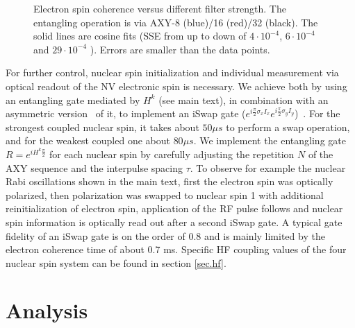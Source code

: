 \documentclass[aps,floatfix,footinbib,superscriptaddress]{revtex4-1}
\begin{document}
\begin{figure}[H]
\centerline{}
\caption{Electron spin coherence versus different filter strength. The entangling operation is via AXY-8 (blue)/16 (red)/32 (black). The solid lines are cosine fits (SSE from up to down of $4\cdot10^{-4}$, $6\cdot10^{-4}$ and $29\cdot10^{-4}$ ). Errors are smaller than the data points.}
\label{fig:S2}
\end{figure}

For further control, nuclear spin initialization and individual measurement via optical readout of the NV electronic spin is necessary. We achieve both by using an entangling gate mediated by $H^k$ (see main text), in combination with an asymmetric version~\cite{Souza4748} of it, to implement an iSwap gate ($e^{i\frac{\pi}{2}\sigma_xI_x}e^{i\frac{\pi}{2}\sigma_yI_y}$)~\cite{Cas17}. For the strongest coupled nuclear spin, it takes about $50\mu s$ to perform a swap operation, and for the weakest coupled one about $80\mu s$. We implement the entangling gate $R=e^{iH^k\frac{\pi}{2}}$ for each nuclear spin by carefully adjusting the repetition $N$ of the AXY sequence and the interpulse spacing $\tau$. To observe for example the nuclear Rabi oscillations shown in the main text, first the electron spin was optically polarized, then polarization was swapped to nuclear spin 1 with additional reinitialization of electron spin, application of the RF pulse follows and nuclear spin information is optically read out after a second iSwap gate. A typical gate fidelity of an iSwap gate is on the order of $0.8$ and is mainly limited by the electron coherence time of about 0.7 ms. Specific HF coupling values of the four nuclear spin system can be found in section \ref{sec.hf}. 

\section{Analysis}
\end{document}
